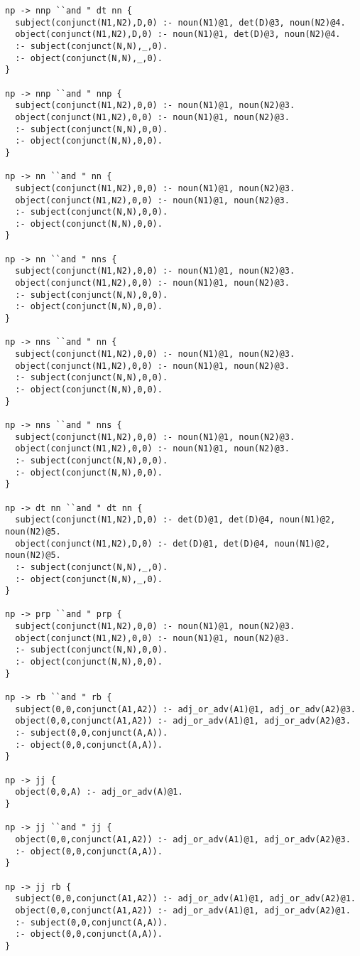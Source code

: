 \begin{lstlisting}
np -> nnp ``and " dt nn {
  subject(conjunct(N1,N2),D,0) :- noun(N1)@1, det(D)@3, noun(N2)@4.
  object(conjunct(N1,N2),D,0) :- noun(N1)@1, det(D)@3, noun(N2)@4.
  :- subject(conjunct(N,N),_,0).
  :- object(conjunct(N,N),_,0).
}

np -> nnp ``and " nnp {
  subject(conjunct(N1,N2),0,0) :- noun(N1)@1, noun(N2)@3.
  object(conjunct(N1,N2),0,0) :- noun(N1)@1, noun(N2)@3.
  :- subject(conjunct(N,N),0,0).
  :- object(conjunct(N,N),0,0).
}

np -> nn ``and " nn {
  subject(conjunct(N1,N2),0,0) :- noun(N1)@1, noun(N2)@3.
  object(conjunct(N1,N2),0,0) :- noun(N1)@1, noun(N2)@3.
  :- subject(conjunct(N,N),0,0).
  :- object(conjunct(N,N),0,0).
}

np -> nn ``and " nns {
  subject(conjunct(N1,N2),0,0) :- noun(N1)@1, noun(N2)@3.
  object(conjunct(N1,N2),0,0) :- noun(N1)@1, noun(N2)@3.
  :- subject(conjunct(N,N),0,0).
  :- object(conjunct(N,N),0,0).
}

np -> nns ``and " nn {
  subject(conjunct(N1,N2),0,0) :- noun(N1)@1, noun(N2)@3.
  object(conjunct(N1,N2),0,0) :- noun(N1)@1, noun(N2)@3.
  :- subject(conjunct(N,N),0,0).
  :- object(conjunct(N,N),0,0).
}

np -> nns ``and " nns {
  subject(conjunct(N1,N2),0,0) :- noun(N1)@1, noun(N2)@3.
  object(conjunct(N1,N2),0,0) :- noun(N1)@1, noun(N2)@3.
  :- subject(conjunct(N,N),0,0).
  :- object(conjunct(N,N),0,0).
}

np -> dt nn ``and " dt nn {
  subject(conjunct(N1,N2),D,0) :- det(D)@1, det(D)@4, noun(N1)@2, noun(N2)@5.
  object(conjunct(N1,N2),D,0) :- det(D)@1, det(D)@4, noun(N1)@2, noun(N2)@5.
  :- subject(conjunct(N,N),_,0).
  :- object(conjunct(N,N),_,0).
}

np -> prp ``and " prp {
  subject(conjunct(N1,N2),0,0) :- noun(N1)@1, noun(N2)@3.
  object(conjunct(N1,N2),0,0) :- noun(N1)@1, noun(N2)@3.
  :- subject(conjunct(N,N),0,0).
  :- object(conjunct(N,N),0,0).
}

np -> rb ``and " rb {
  subject(0,0,conjunct(A1,A2)) :- adj_or_adv(A1)@1, adj_or_adv(A2)@3.
  object(0,0,conjunct(A1,A2)) :- adj_or_adv(A1)@1, adj_or_adv(A2)@3.
  :- subject(0,0,conjunct(A,A)).
  :- object(0,0,conjunct(A,A)).
}

np -> jj {
  object(0,0,A) :- adj_or_adv(A)@1.
}

np -> jj ``and " jj {
  object(0,0,conjunct(A1,A2)) :- adj_or_adv(A1)@1, adj_or_adv(A2)@3.
  :- object(0,0,conjunct(A,A)).
}

np -> jj rb {
  subject(0,0,conjunct(A1,A2)) :- adj_or_adv(A1)@1, adj_or_adv(A2)@1.
  object(0,0,conjunct(A1,A2)) :- adj_or_adv(A1)@1, adj_or_adv(A2)@1.
  :- subject(0,0,conjunct(A,A)).
  :- object(0,0,conjunct(A,A)).
}


\end{lstlisting}
